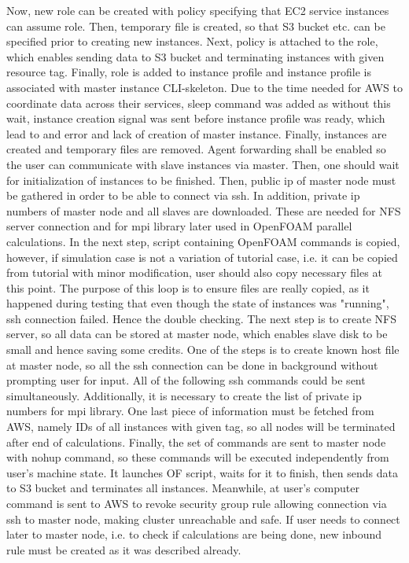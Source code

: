 \documentclass[11pt,english]{article}
\begin{document}
Now, new role can be created with policy specifying that EC2 service instances can assume role. Then, temporary file is created, so that S3 bucket etc. can be specified prior to creating new instances. Next, policy is attached to the role, which enables sending data to S3 bucket and terminating instances with given resource tag. Finally, role is added to instance profile and instance profile is associated with master instance CLI-skeleton. Due to the time needed for AWS to coordinate data across their services, sleep command was added as without this wait, instance creation signal was sent before instance profile was ready, which lead to and error and lack of creation of master instance. Finally, instances are created and temporary files are removed.
Agent forwarding shall be enabled so the user can communicate with slave instances via master. Then, one should wait for initialization of instances to be finished.
Then, public ip of master node must be gathered in order to be able to connect via ssh. In addition, private ip numbers of master node and all slaves are downloaded. These are needed for NFS server connection and for mpi library later used in OpenFOAM parallel calculations.
In the next step, script containing OpenFOAM commands is copied, however, if simulation case is not a variation of tutorial case, i.e. it can be copied from tutorial with minor modification, user should also copy necessary files at this point. The purpose of this loop is to ensure files are really copied, as it happened during testing that even though the state of instances was "running", ssh connection failed. Hence the double checking.
The next step is to create NFS server, so all data can be stored at master node, which enables slave disk to be small and hence saving some credits. One of the steps is to create known host file at master node, so all the ssh connection can be done in background without prompting user for input. All of the following ssh commands could be sent simultaneously.
Additionally, it is necessary to create the list of private ip numbers for mpi library. One last piece of information must be fetched from AWS, namely IDs of all instances with given tag, so all nodes will be terminated after end of calculations.
Finally, the set of commands are sent to master node with nohup command, so these commands will be executed independently from user's machine state. It launches OF script, waits for it to finish, then sends data to S3 bucket and terminates all instances. Meanwhile, at user's computer command is sent to AWS to revoke security group rule allowing connection via ssh to master node, making cluster unreachable and safe. If user needs to connect later to master node, i.e. to check if calculations are being done, new inbound rule must be created as it was described already.
\end{document}
